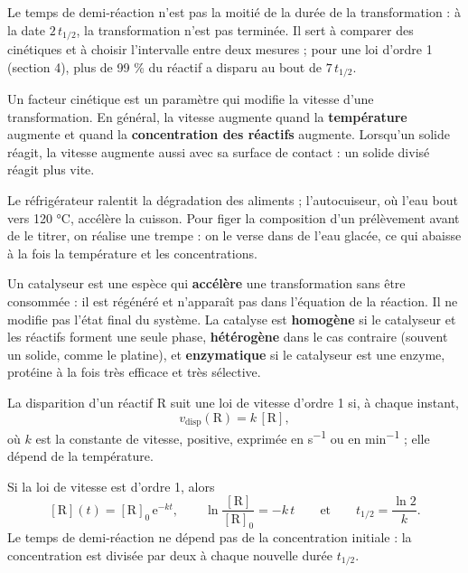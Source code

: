 \begin{attention}
Le temps de demi-réaction n'est pas la moitié de la durée de la transformation : à la date $2\,t_{1/2}$, la
transformation n'est pas terminée. Il sert à comparer des cinétiques et à choisir l'intervalle entre deux mesures ;
pour une loi d'ordre 1 (section 4), plus de 99 \% du réactif a disparu au bout de $7\,t_{1/2}$.
\end{attention}
\begin{propriete}
Un facteur cinétique est un paramètre qui modifie la vitesse d'une transformation. En général, la vitesse augmente
quand la \textbf{température} augmente et quand la \textbf{concentration des réactifs} augmente. Lorsqu'un solide
réagit, la vitesse augmente aussi avec sa surface de contact : un solide divisé réagit plus vite.
\end{propriete}
\begin{exemple}
Le réfrigérateur ralentit la dégradation des aliments ; l'autocuiseur, où l'eau bout vers 120 °C, accélère la cuisson.
Pour figer la composition d'un prélèvement avant de le titrer, on réalise une trempe : on le verse dans de l'eau
glacée, ce qui abaisse à la fois la température et les concentrations.
\end{exemple}
\begin{definition}[Catalyseur]
Un catalyseur est une espèce qui \textbf{accélère} une transformation sans être consommée : il est régénéré et
n'apparaît pas dans l'équation de la réaction. Il ne modifie pas l'état final du système. La catalyse est
\textbf{homogène} si le catalyseur et les réactifs forment une seule phase, \textbf{hétérogène} dans le cas contraire
(souvent un solide, comme le platine), et \textbf{enzymatique} si le catalyseur est une enzyme, protéine à la fois
très efficace et très sélective.
\end{definition}
\begin{definition}
La disparition d'un réactif R suit une loi de vitesse d'ordre 1 si, à chaque instant,
\[v_\mathrm{disp}(\mathrm{R})=k\,[\mathrm{R}],\]
où $k$ est la constante de vitesse, positive, exprimée en \unit{s^{-1}} ou en \unit{min^{-1}} ; elle dépend de la température.
\end{definition}
\begin{theoreme}
Si la loi de vitesse est d'ordre 1, alors
\[[\mathrm{R}](t)=[\mathrm{R}]_0\,\mathrm{e}^{-kt},\qquad\ln\frac{[\mathrm{R}]}{[\mathrm{R}]_0}=-k\,t
\qquad\text{et}\qquad t_{1/2}=\frac{\ln2}{k}.\]
Le temps de demi-réaction ne dépend pas de la concentration initiale : la concentration est divisée par deux à
chaque nouvelle durée $t_{1/2}$.
\end{theoreme}
